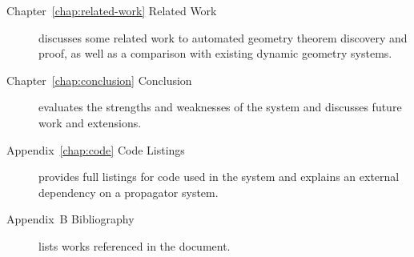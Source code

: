 \begin{description}
\item[Chapter~\ref{chap:related-work} Related Work] discusses some
  related work to automated geometry theorem discovery and proof, as
  well as a comparison with existing dynamic geometry systems.

\item[Chapter~\ref{chap:conclusion} Conclusion] evaluates the strengths and
  weaknesses of the system and discusses future work and extensions.

\item[Appendix~\ref{chap:code} Code Listings] provides full listings for code
  used in the system and explains an external dependency on a
  propagator system.

\item[Appendix~B Bibliography] lists works referenced in the document.

\end{description}
